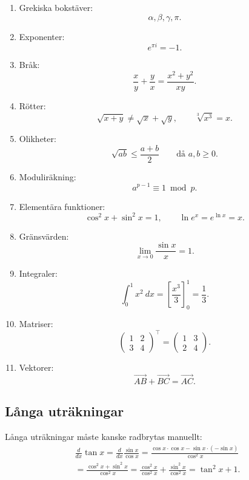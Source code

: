 \documentclass{article}
\begin{document}
\begin{enumerate}

\item Grekiska bokstäver: 
$$
\alpha, \beta, \gamma, \pi.
$$

\item Exponenter: 
$$
e^{\pi i} = -1.
$$

\item Bråk: 
$$
\frac{x}{y} + \frac{y}{x} = \frac{x^2+y^2}{xy}.
$$

\item Rötter: 
$$
\sqrt{x+y} \neq \sqrt{x} + \sqrt{y}, \qquad \sqrt[3]{x^3}=x.
$$

\item Olikheter: 
$$
\sqrt{ab} \leq \frac{a+b}{2} \qquad \text{då $a,b\geq 0$.} 
$$

\item Moduliräkning: 
$$
a^{p-1} \equiv 1 \bmod p.
$$

\item Elementära funktioner: 
$$
\cos^2 x + \sin^2 x = 1, \qquad \ln e^x = e^{\ln x} = x.
$$

\item Gränsvärden: 
$$
\lim_{x\to 0} \frac{\sin x}{x} = 1.
$$

\item Integraler: 
$$
\int_{0}^1 x^2 \ dx = \left[ \frac{x^3}{3} \right]_0^1 = \frac{1}{3}.
$$


\item Matriser: 
$$
\begin{pmatrix}
1 & 2 \\
3 & 4
\end{pmatrix}^\top
=
\begin{pmatrix}
1 & 3 \\
2 & 4
\end{pmatrix}.
$$

\item Vektorer: 
$$
\overrightarrow{AB} + \overrightarrow{BC} = \overrightarrow{AC}.
$$

\end{enumerate}

\subsection{Långa uträkningar}

Långa uträkningar måste kanske radbrytas manuellt: 
\begin{multline*}
\frac{d}{dx}\tan x = \frac{d}{dx}\frac{\sin x}{\cos x} 
= \frac{\cos x\cdot \cos x - \sin x \cdot (-\sin x)}{\cos^2 x} \\ %
= \frac{\cos^2 x + \sin^2 x}{\cos^2 x} 
= \frac{\cos^2 x}{\cos^2 x} + \frac{\sin^2 x}{\cos^2 x} 
= \tan^2 x + 1.
\end{multline*}
\end{document}
